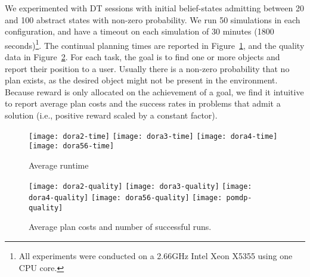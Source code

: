 
We experimented with DT sessions with initial belief-states admitting
between 20 and 100 abstract states with non-zero probability. We run
50 simulations in each configuration, and have a timeout on each
simulation of 30 minutes (1800 seconds)\footnote{All experiments were
conducted on a 2.66GHz Intel Xeon X5355 using one CPU core.}. The
continual planning times are reported in
Figure~\ref{fig:results-time}, and the quality data in
Figure~\ref{fig:results-quality}.
For each task, the goal is to find one or more objects and report
their position to a user. Usually there is a non-zero probability that
no plan exists, as the desired object might not be present in the
environment.
Because reward is only allocated on the achievement of a goal, we
find it intuitive to report average plan costs and the success rates
in problems that admit a solution (i.e., positive reward scaled by a
constant factor).

\begin{figure}[h!]
  \texttt{[image: dora2-time]}\hfill
  \texttt{[image: dora3-time]}\hfill
  \texttt{[image: dora4-time]}\hfill
  \vspace{2mm}
  \texttt{[image: dora56-time]}\hfill
  \caption{Average runtime}
  \label{fig:results-time}
\end{figure}

\begin{figure}[h!]
  \texttt{[image: dora2-quality]}\hfill
  \texttt{[image: dora3-quality]}\hfill
  \texttt{[image: dora4-quality]}\hfill
  \vspace{2mm}
  \texttt{[image: dora56-quality]}\hfill
  \vspace{2mm}
  \texttt{[image: pomdp-quality]}\hfill
  \caption{Average plan costs and number of successful runs.}
  \label{fig:results-quality}
\end{figure}


